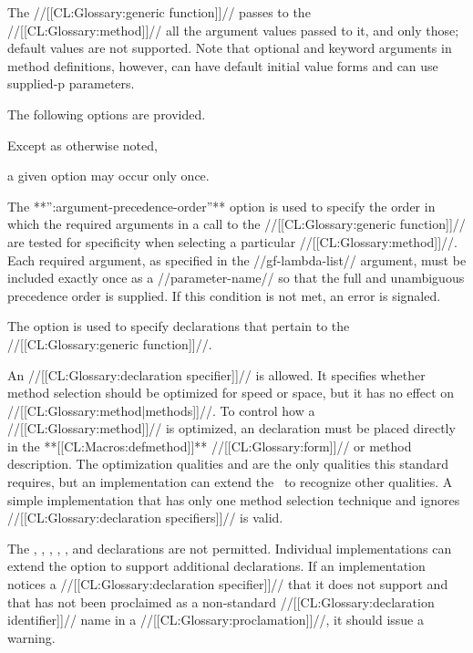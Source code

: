 The //[[CL:Glossary:generic function]]// passes to the //[[CL:Glossary:method]]// all the argument values passed to it, and only those; default values are not supported. Note that optional and keyword arguments in method definitions, however, can have default initial value forms and can use supplied-p parameters.

The following options are provided.

Except as otherwise noted,

a given option may occur only once.

\beginlist

\itemitem{\bull} The **'':argument-precedence-order''** option is used to specify the order in which the required arguments in a call to the //[[CL:Glossary:generic function]]// are tested for specificity when selecting a particular //[[CL:Glossary:method]]//. Each required argument, as specified in the //gf-lambda-list// argument, must be included exactly once as a //parameter-name// so that the full and unambiguous precedence order is supplied. If this condition is not met, an error is signaled. 

\itemitem{\bull} The  option is used to specify declarations that pertain to the //[[CL:Glossary:generic function]]//.

An  //[[CL:Glossary:declaration specifier]]// is allowed. It specifies whether method selection should be optimized for speed or space, but it has no effect on //[[CL:Glossary:method|methods]]//. To control how a //[[CL:Glossary:method]]// is optimized, an  declaration must be placed directly in the **[[CL:Macros:defmethod]]** //[[CL:Glossary:form]]// or method description. The optimization qualities  and  are the only qualities this standard requires, but an implementation can extend the \CLOS\ to recognize other qualities. A simple implementation that has only one method selection technique and ignores  //[[CL:Glossary:declaration specifiers]]// is valid.

The , , , , , and  declarations are not permitted. Individual implementations can extend the  option to support additional declarations.  If an implementation notices a //[[CL:Glossary:declaration specifier]]// that it does not support and that has not been proclaimed as a non-standard //[[CL:Glossary:declaration identifier]]// name in a  //[[CL:Glossary:proclamation]]//, it should issue a warning. 

